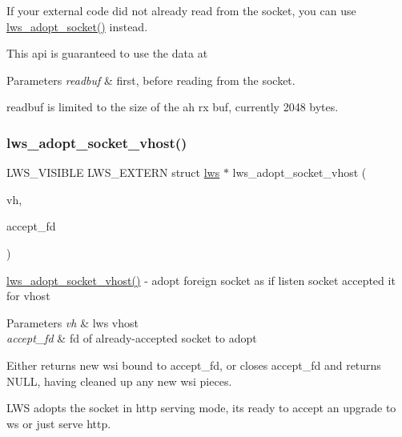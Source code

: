 If your external code did not already read from the socket, you can use \hyperlink{group__sock-adopt_ga2003db73fc10b05b8e17a9ee715727a9}{lws\+\_\+adopt\+\_\+socket()} instead.

This api is guaranteed to use the data at 
\begin{DoxyParams}{Parameters}
{\em readbuf} & first, before reading from the socket.\\
\hline
\end{DoxyParams}
readbuf is limited to the size of the ah rx buf, currently 2048 bytes. \mbox{\label{group__sock-adopt_gab95398ca701a0a5189381fb472a890cc}} 
\subsubsection{\texorpdfstring{lws\+\_\+adopt\+\_\+socket\+\_\+vhost()}{lws\_adopt\_socket\_vhost()}}
{\footnotesize\ttfamily L\+W\+S\+\_\+\+V\+I\+S\+I\+B\+LE L\+W\+S\+\_\+\+E\+X\+T\+E\+RN struct \hyperlink{structlws}{lws} $\ast$ lws\+\_\+adopt\+\_\+socket\+\_\+vhost (\begin{DoxyParamCaption}\item[{struct lws\+\_\+vhost $\ast$}]{vh,  }\item[{lws\+\_\+sockfd\+\_\+type}]{accept\+\_\+fd }\end{DoxyParamCaption})}

\hyperlink{group__sock-adopt_gab95398ca701a0a5189381fb472a890cc}{lws\+\_\+adopt\+\_\+socket\+\_\+vhost()} -\/ adopt foreign socket as if listen socket accepted it for vhost


\begin{DoxyParams}{Parameters}
{\em vh} & lws vhost \\
\hline
{\em accept\+\_\+fd} & fd of already-\/accepted socket to adopt\\
\hline
\end{DoxyParams}
Either returns new wsi bound to accept\+\_\+fd, or closes accept\+\_\+fd and returns N\+U\+LL, having cleaned up any new wsi pieces.

L\+WS adopts the socket in http serving mode, it\textquotesingle{}s ready to accept an upgrade to ws or just serve http. \mbox{\label{group__sock-adopt_ga1ad01edd42dab4deca1b1c25694e0f3d}} 
